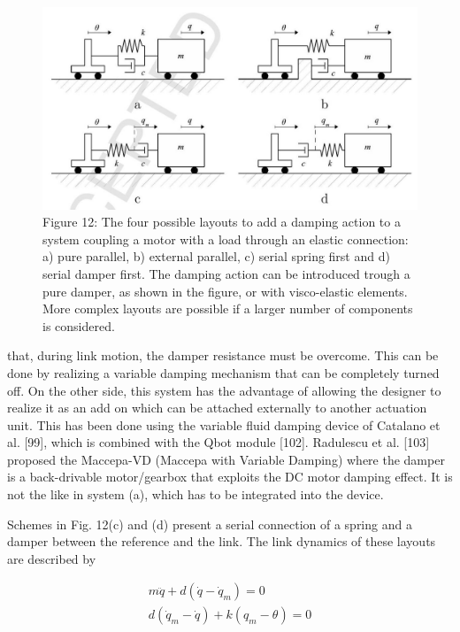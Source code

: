\documentclass[10pt]{article}
\begin{document}
\begin{figure}[h]
\begin{center}
  \includegraphics[width=\textwidth]{2025_09_17_f0417c8723605e4ad1efg-25}
\captionsetup{labelformat=empty}
\caption{Figure 12: The four possible layouts to add a damping action to a system coupling a motor with a load through an elastic connection: a) pure parallel, b) external parallel, c) serial spring first and d) serial damper first. The damping action can be introduced trough a pure damper, as shown in the figure, or with visco-elastic elements. More complex layouts are possible if a larger number of components is considered.}
\end{center}
\end{figure}

that, during link motion, the damper resistance must be overcome. This can be done by realizing a variable damping mechanism that can be completely turned off. On the other side, this system has the advantage of allowing the designer to realize it as an add on which can be attached externally to another actuation unit. This has been done using the variable fluid damping device of Catalano et al. [99], which is combined with the Qbot module [102]. Radulescu et al. [103] proposed the Maccepa-VD (Maccepa with Variable Damping) where the damper is a back-drivable motor/gearbox that exploits the DC motor damping effect. It is not the like in system (a), which has to be integrated into the device.

Schemes in Fig. 12(c) and (d) present a serial connection of a spring and a damper between the reference and the link. The link dynamics of these layouts are described by


\begin{gather*}
m \ddot{q}+d\left(\dot{q}-\dot{q}_{m}\right)=0 \\
d\left(\dot{q}_{m}-\dot{q}\right)+k\left(q_{m}-\theta\right)=0 \tag{9}
\end{gather*}
\end{document}
